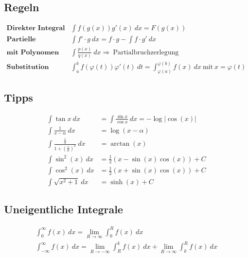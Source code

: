 \documentclass[11pt]{article}
\begin{document}
\subsection{Regeln}

\begin{equation*}
\begin{split}
	\textbf{Direkter Integral}\quad & \int f(g(x))g'(x)\ dx = F(g(x)) \\
	\textbf{Partielle Integration}\quad & \int f' \cdot g\ dx = f \cdot g - \int f \cdot g'\ dx \\
	\textbf{mit Polynomen}\quad & \int\frac{p(x)}{q(x)}\ dx \Rightarrow\ \text{Partialbruchzerlegung} \\
	\textbf{Substitution}\quad & \int_a^b f(\varphi(t))\varphi'(t)\ dt = \int_{\varphi(a)}^{\varphi(b)} f(x)\ dx\ \text{mit}\ x = \varphi(t)
\end{split}
\end{equation*}

\subsection{Tipps}

\begin{equation*}
\begin{split}
	\int\tan x\ dx & = \int\frac{\sin x}{\cos x}\ dx = -\log|\cos(x)| \\
	\int \frac{1}{x - \alpha}\ dx & = \log(x-\alpha) \\
	\int\frac{\frac{1}{\alpha}}{1+(\frac{x}{\alpha})^2}\ dx & = \arctan(x) \\
	\int \sin^2(x)\ dx & = \frac{1}{2}(x - \sin(x)\cos(x)) + C \\
	\int \cos^2(x)\ dx & = \frac{1}{2}(x + \sin(x)\cos(x)) + C \\
	\int \sqrt{x^2+1}\ dx & = \sinh(x) + C
\end{split}
\end{equation*}

\subsection{Uneigentliche Integrale}

\begin{equation*}
\begin{split}
	\int_0^\infty f(x)\ dx = \lim_{R \to \infty} \int_0^R f(x)\ dx \\
	\int_{-\infty}^\infty f(x)\ dx = \lim_{R \to -\infty} \int_R^k f(x)\ dx + \lim_{R \to \infty} \int_k^R f(x)\ dx
\end{split}
\end{equation*}
\end{document}
